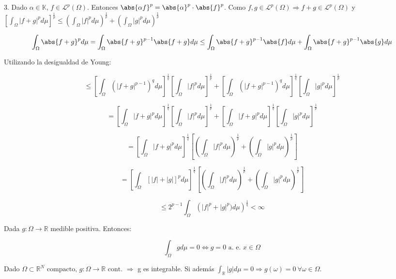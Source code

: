 \begin{sol}

    3.
    Dado $\alpha \in \mathbb K$, $f \in \mathcal L^p (\Omega)$. Entonces $\abs{\alpha f}^p = \abs{\alpha}^p \cdot \abs{f}^p$.
    Como $f, g \in \mathcal L^p(\Omega) \Rightarrow f + g \in \mathcal L^p(\Omega)$ y $ \displaystyle \left[ \int_{\Omega} |f+g|^{p} d \mu \right]^{\frac{1}{p}} \leq \left( \int_{\Omega} |f|^{p} d \mu \right)^{\frac{1}{p}} + \left( \int_{\Omega} |g|^{p} d \mu \right)^{\frac{1}{p}}$

    $$\int_{\Omega} \abs{f+g}^p d \mu = \int_{\Omega}\abs{f+g}^{p-1} \abs{f+g}d \mu \leq \int_{\Omega} \abs{f+g}^{p-1} \abs{f}d \mu + \int_{\Omega} \abs{f+g}^{p-1} \abs{g}d \mu$$

    Utilizando la desigualdad de Young:

    $$\leq \left[ \int_{\Omega} \left( |f+g|^{p-1} \right)^q d \mu \right]^{\frac{1}{q}} \left[ \int_{\Omega} |f|^{p} d \mu \right]^{\frac{1}{p}} + \left[ \int_{\Omega} \left( |f+g|^{p-1} \right)^q d \mu \right]^{\frac{1}{q}} \left[ \int_{\Omega} |g|^{p} d \mu \right]^{\frac{1}{p}}$$

    $$= \left[ \int_{\Omega} |f+g|^{p} d \mu \right]^{\frac{1}{q}} \left[ \int_{\Omega} |f|^{p} d \mu \right]^{\frac{1}{p}} + \left[ \int_{\Omega} |f+g|^{p} d \mu \right]^{\frac{1}{q}} \left[ \int_{\Omega} |g|^{p} d \mu \right]^{\frac{1}{p}}$$

    $$= \left[ \int_{\Omega} |f+g|^{p} d \mu \right]^{\frac{1}{q}} \left[ \left( \int_{\Omega} |f|^{p} d \mu \right)^{\frac{1}{p}} + \left( \int_{\Omega} |g|^{p} d \mu \right)^{\frac{1}{p}} \right]$$

    $$= \left[ \int_{\Omega} \left[ |f|+|g| \right]^{p} d \mu \right]^{\frac{1}{q}} \left[ \left( \int_{\Omega} |f|^{p} d \mu \right)^{\frac{1}{p}} + \left( \int_{\Omega} |g|^{p} d \mu \right)^{\frac{1}{p}} \right]$$

    $$ \leq 2^{p-1} \int_{\Omega} \left( |f|^p + |g|^p) d \mu \right)^{\frac{1}{q}} < \infty$$

  \end{sol}


\begin{ejer}
  Dada $g : \Omega \rightarrow \mathbb R$ medible positiva. Entonces:

  $$\int_{\Omega} g d \mu = 0 \Leftrightarrow g = 0 \text{ a. e. } x \in \Omega$$
\end{ejer}

\begin{ejer}
  Dado $\Omega \subset \mathbb R^N \text{ compacto, } g: \Omega \rightarrow \mathbb R \text{ cont. } \Rightarrow$ g es integrable. Si además $\int_{\mathbb R} |g| d \mu = 0 \Rightarrow g(\omega) = 0 \ \forall \omega \in \Omega$.
\end{ejer}

